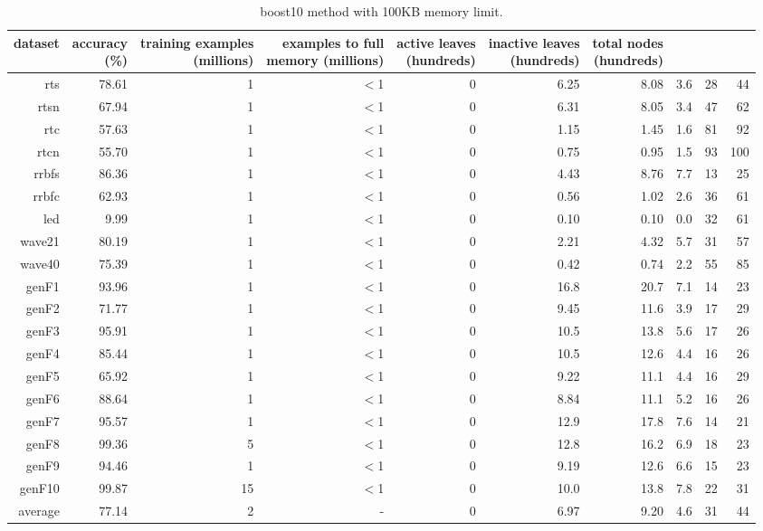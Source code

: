 \begin{table}
\caption{{\sc boost10} method with 100KB memory limit.}
\label{tab:boost10-100k}
\centering
\begin{tabular}{|r|r|r|r|r|r|r|r|r|r|}
\hline
dataset	&
\rotatebox{90}{\parbox{9em}{accuracy\\(\%)}} &
\rotatebox{90}{\parbox{9em}{training examples\\(millions)}} &
\rotatebox{90}{\parbox{9em}{examples to full\\memory (millions)}} &
\rotatebox{90}{\parbox{9em}{active leaves\\(hundreds)}} &
\rotatebox{90}{\parbox{9em}{inactive leaves\\(hundreds)}} &
\rotatebox{90}{\parbox{9em}{total nodes\\(hundreds)}} &
\rotatebox{90}{\parbox{9em}{average tree depth}}	&
\rotatebox{90}{\parbox{9em}{training speed (\%)}} &
\rotatebox{90}{\parbox{9em}{prediction speed (\%)}} \\
\hline
{\sc rts} & 78.61 & 1 & $<$1 & 0 & 6.25 & 8.08 & 3.6 & 28 & 44 \\
{\sc rtsn} & 67.94 & 1 & $<$1 & 0 & 6.31 & 8.05 & 3.4 & 47 & 62 \\
{\sc rtc} & 57.63 & 1 & $<$1 & 0 & 1.15 & 1.45 & 1.6 & 81 & 92 \\
{\sc rtcn} & 55.70 & 1 & $<$1 & 0 & 0.75 & 0.95 & 1.5 & 93 & 100 \\
{\sc rrbfs} & 86.36 & 1 & $<$1 & 0 & 4.43 & 8.76 & 7.7 & 13 & 25 \\
{\sc rrbfc} & 62.93 & 1 & $<$1 & 0 & 0.56 & 1.02 & 2.6 & 36 & 61 \\
{\sc led} & 9.99 & 1 & $<$1 & 0 & 0.10 & 0.10 & 0.0 & 32 & 61 \\
{\sc wave21} & 80.19 & 1 & $<$1 & 0 & 2.21 & 4.32 & 5.7 & 31 & 57 \\
{\sc wave40} & 75.39 & 1 & $<$1 & 0 & 0.42 & 0.74 & 2.2 & 55 & 85 \\
{\sc genF1} & 93.96 & 1 & $<$1 & 0 & 16.8 & 20.7 & 7.1 & 14 & 23 \\
{\sc genF2} & 71.77 & 1 & $<$1 & 0 & 9.45 & 11.6 & 3.9 & 17 & 29 \\
{\sc genF3} & 95.91 & 1 & $<$1 & 0 & 10.5 & 13.8 & 5.6 & 17 & 26 \\
{\sc genF4} & 85.44 & 1 & $<$1 & 0 & 10.5 & 12.6 & 4.4 & 16 & 26 \\
{\sc genF5} & 65.92 & 1 & $<$1 & 0 & 9.22 & 11.1 & 4.4 & 16 & 29 \\
{\sc genF6} & 88.64 & 1 & $<$1 & 0 & 8.84 & 11.1 & 5.2 & 16 & 26 \\
{\sc genF7} & 95.57 & 1 & $<$1 & 0 & 12.9 & 17.8 & 7.6 & 14 & 21 \\
{\sc genF8} & 99.36 & 5 & $<$1 & 0 & 12.8 & 16.2 & 6.9 & 18 & 23 \\
{\sc genF9} & 94.46 & 1 & $<$1 & 0 & 9.19 & 12.6 & 6.6 & 15 & 23 \\
{\sc genF10} & 99.87 & 15 & $<$1 & 0 & 10.0 & 13.8 & 7.8 & 22 & 31 \\
\hline
average & 77.14 & 2 &  -  & 0 & 6.97 & 9.20 & 4.6 & 31 & 44 \\
\hline
\end{tabular}
\end{table}

